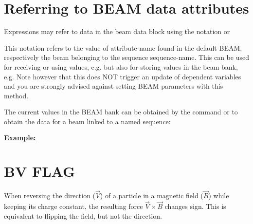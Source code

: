 \section{Referring to BEAM data attributes}
 
Expressions may refer to data in the beam data block using the
notation  
or 

This notation refers to the value of attribute-name found in the default
BEAM, respectively the beam belonging to the sequence sequence-name. 
This can be used for receiving or using values, e.g. 
but also for storing values in the beam bank, e.g.  
Note however that this does NOT trigger an update of dependent variables
and you are strongly advised against setting BEAM parameters with this method.

The current values in the BEAM bank can be obtained by the command
or to obtain the data for a beam linked to a named sequence:


{\bf \underline{Example:}} 





\section{BV FLAG}
\label{sec.bvflag}
When reversing the direction ($\vec V$) of a particle in a magnetic field
($\vec B$) while keeping its charge constant, the resulting force $\vec
V \times \vec B$ changes sign. This is equivalent to flipping the field,
but not the direction.  

